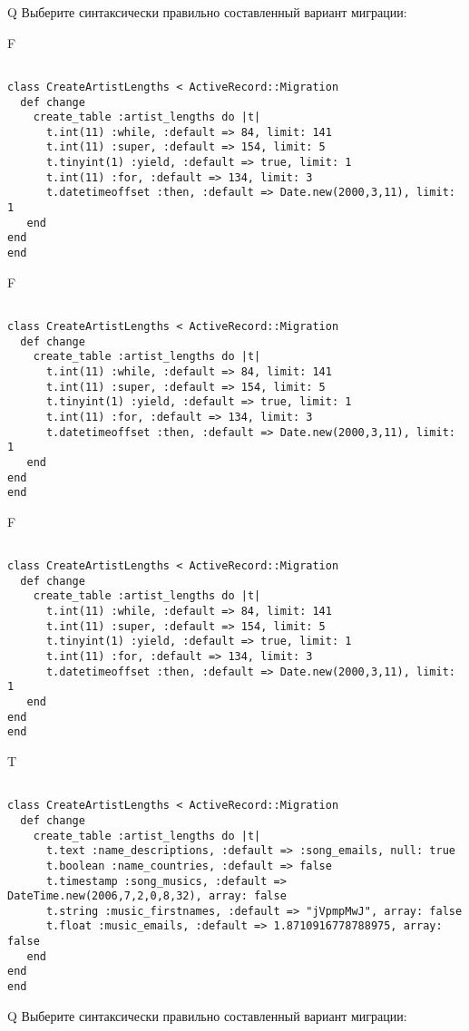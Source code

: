 Q
Выберите синтаксически правильно составленный вариант миграции:

F
\begin{verbatim}
		
class CreateArtistLengths < ActiveRecord::Migration 
  def change 
    create_table :artist_lengths do |t| 
      t.int(11) :while, :default => 84, limit: 141
      t.int(11) :super, :default => 154, limit: 5
      t.tinyint(1) :yield, :default => true, limit: 1
      t.int(11) :for, :default => 134, limit: 3
      t.datetimeoffset :then, :default => Date.new(2000,3,11), limit: 1
   end
end
end
\end{verbatim}

F
\begin{verbatim}
		
class CreateArtistLengths < ActiveRecord::Migration 
  def change 
    create_table :artist_lengths do |t| 
      t.int(11) :while, :default => 84, limit: 141
      t.int(11) :super, :default => 154, limit: 5
      t.tinyint(1) :yield, :default => true, limit: 1
      t.int(11) :for, :default => 134, limit: 3
      t.datetimeoffset :then, :default => Date.new(2000,3,11), limit: 1
   end
end
end
\end{verbatim}

F
\begin{verbatim}
		
class CreateArtistLengths < ActiveRecord::Migration 
  def change 
    create_table :artist_lengths do |t| 
      t.int(11) :while, :default => 84, limit: 141
      t.int(11) :super, :default => 154, limit: 5
      t.tinyint(1) :yield, :default => true, limit: 1
      t.int(11) :for, :default => 134, limit: 3
      t.datetimeoffset :then, :default => Date.new(2000,3,11), limit: 1
   end
end
end
\end{verbatim}

T
\begin{verbatim}
		
class CreateArtistLengths < ActiveRecord::Migration 
  def change 
    create_table :artist_lengths do |t| 
      t.text :name_descriptions, :default => :song_emails, null: true
      t.boolean :name_countries, :default => false
      t.timestamp :song_musics, :default => DateTime.new(2006,7,2,0,8,32), array: false
      t.string :music_firstnames, :default => "jVpmpMwJ", array: false
      t.float :music_emails, :default => 1.8710916778788975, array: false
   end
end
end
\end{verbatim}

Q
Выберите синтаксически правильно составленный вариант миграции:

